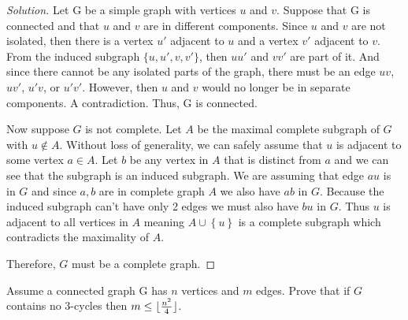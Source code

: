 \documentclass[10pt]{article}
\DeclarePairedDelimiter\floor{\lfloor}{\rfloor}
\newenvironment{problem}[2][Problem]{\begin{trivlist}
		\item[\hskip \labelsep {\bfseries #1}\hskip \labelsep {\bfseries #2.}]}{\end{trivlist}}
\newenvironment{solution}{\begin{proof}[Solution]}{\end{proof}}
\begin{document}
	\begin{solution}\quad\newline%
    
    Let G be a simple graph with vertices $u$ and $v$. Suppose that G is connected and that $u$ and $v$ are in different components. Since $u$ and $v$ are not isolated, then there is a vertex $u'$ adjacent to $u$ and a vertex $v'$ adjacent to $v$. From the induced subgraph $\{u, u', v, v'\}$, then $uu'$ and $vv'$ are part of it. And since there cannot be any isolated parts of the graph, there must be an edge $uv$, $uv'$, $u'v$, or $u'v'$. However, then $u$ and $v$ would no longer be in separate components. A contradiction. Thus, G is connected.
    
    Now suppose $G$ is not complete. Let $A$ be the maximal complete subgraph of $G$ with $u\notin A$. Without loss of generality, we can safely assume that $u$ is adjacent to some vertex $a\in A$. Let $b$ be any vertex in $A$ that is distinct from $a$ and we can see that the subgraph is an induced subgraph. We are assuming that edge $au$ is in $G$ and since $a,b$ are in complete graph $A$ we also have $ab$ in $G$. Because the induced subgraph can't have only 2 edges we must also have $bu$ in $G$. Thus $u$ is adjacent to all vertices in $A$ meaning $A \cup$$\left\{u\right\}$ is a complete subgraph which contradicts the maximality of $A$.
    
    Therefore, $G$ must be a complete graph.
    
    \end{solution}
	
	
	
	\vspace{0.15in} %
	
	\begin{problem}{2}%
		Assume a connected graph G has $n$ vertices and $m$ edges. Prove that if $G$ contains no $3$-cycles then $m \leq \floor{\frac{n^2}{4}}$.
	\end{problem}
	
\end{document}
